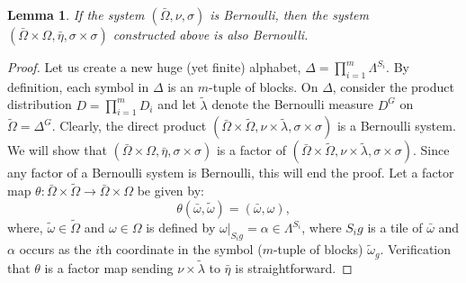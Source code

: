\documentclass{amsart}
\newtheorem{lem}[thm]{Lemma}
\theoremstyle{remark}
\begin{document}
\begin{lem}\label{l2}If the system $(\bar\Omega,\nu,\sigma)$ is Bernoulli, then the system $(\bar\Omega\times\Omega,\bar\eta,\sigma\times\sigma)$ constructed above is also Bernoulli.
\end{lem}
\begin{proof}Let us create a new huge (yet finite) alphabet, $\Delta=\prod_{i=1}^m\Lambda^{S_i}$. By definition, each symbol in $\Delta$ is an  $m$-tuple of blocks. On $\Delta$, consider the product distribution $D=\prod_{i=1}^mD_i$ and let $\tilde\lambda$ denote the Bernoulli measure $D^G$ on $\tilde\Omega=\Delta^G$. Clearly, the direct product $(\bar\Omega\times\tilde\Omega,\nu\times\tilde\lambda,\sigma\times\sigma)$ is a Bernoulli system. We will show that  $(\bar\Omega\times\Omega,\bar\eta,\sigma\times\sigma)$ is a factor of $(\bar\Omega\times\tilde\Omega,\nu\times\tilde\lambda,\sigma\times\sigma)$. Since any factor of a Bernoulli system is Bernoulli, this will end the proof. Let a factor map $\theta:\bar\Omega\times\tilde\Omega\to\bar\Omega\times\Omega$ be given by:
$$
\theta(\bar\omega,\tilde\omega) = (\bar\omega,\omega),
$$
where, $\tilde\omega\in\tilde\Omega$ and $\omega\in\Omega$ is defined by $\omega|_{S_ig}=\alpha\in\Lambda^{S_i}$, where $S_ig$ is a tile of $\bar\omega$ and $\alpha$ occurs as the $i$th coordinate in the symbol ($m$-tuple of blocks) $\tilde\omega_g$. Verification that $\theta$ is a factor map sending $\nu\times\tilde\lambda$ to $\bar\eta$ is straightforward.
\end{proof}
\end{document}
